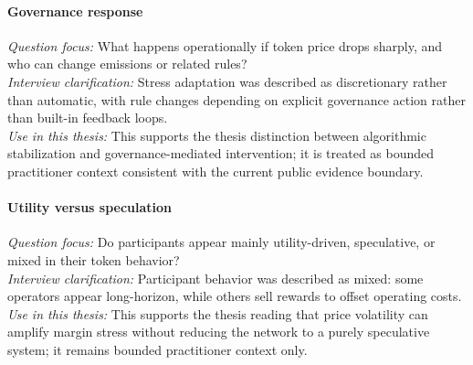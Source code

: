 \paragraph{Governance response}
\emph{Question focus:} What happens operationally if token price drops sharply, and who can change emissions or related rules? \\
\emph{Interview clarification:} Stress adaptation was described as discretionary rather than automatic, with rule changes depending on explicit governance action rather than built-in feedback loops. \\
\emph{Use in this thesis:} This supports the thesis distinction between algorithmic stabilization and governance-mediated intervention; it is treated as bounded practitioner context consistent with the current public evidence boundary.

\paragraph{Utility versus speculation}
\emph{Question focus:} Do participants appear mainly utility-driven, speculative, or mixed in their token behavior? \\
\emph{Interview clarification:} Participant behavior was described as mixed: some operators appear long-horizon, while others sell rewards to offset operating costs. \\
\emph{Use in this thesis:} This supports the thesis reading that price volatility can amplify margin stress without reducing the network to a purely speculative system; it remains bounded practitioner context only.
